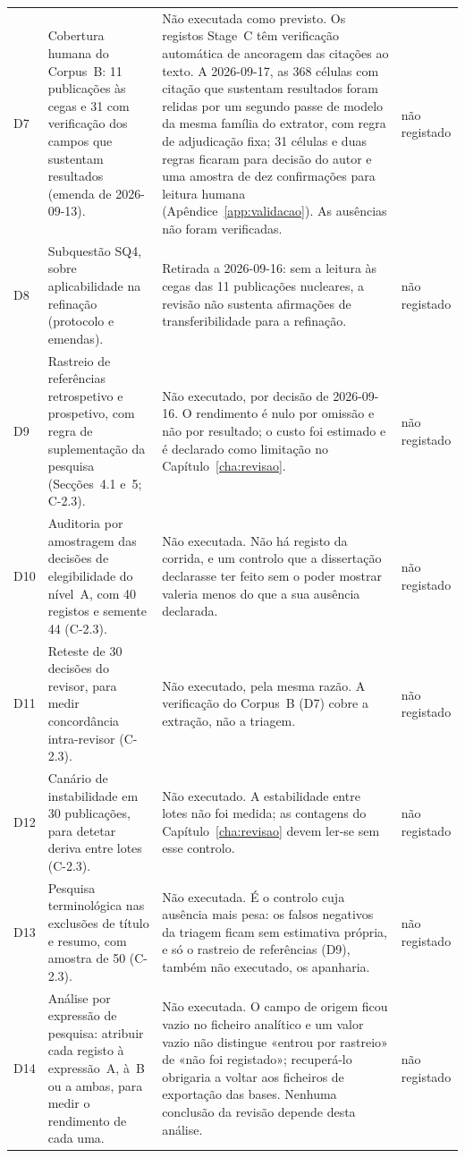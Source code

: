 {\begin{xltabular}{\linewidth}{@{}l>{\raggedright\arraybackslash}X>{\raggedright\arraybackslash}Xl@{}}
D7 & Cobertura humana do Corpus~B: 11 publicações às cegas e 31 com verificação dos campos que sustentam resultados (emenda de 2026-09-13). & Não executada como previsto. Os registos Stage~C têm verificação automática de ancoragem das citações ao texto. A 2026-09-17, as 368 células com citação que sustentam resultados foram relidas por um segundo passe de modelo da mesma família do extrator, com regra de adjudicação fixa; 31 células e duas regras ficaram para decisão do autor e uma amostra de dez confirmações para leitura humana (Apêndice~\ref{app:validacao}). As ausências não foram verificadas. & não registado \\
D8 & Subquestão SQ4, sobre aplicabilidade na refinação (protocolo e emendas). & Retirada a 2026-09-16: sem a leitura às cegas das 11 publicações nucleares, a revisão não sustenta afirmações de transferibilidade para a refinação. & não registado \\
D9 & Rastreio de referências retrospetivo e prospetivo, com regra de suplementação da pesquisa (Secções~4.1 e~5; C-2.3). & Não executado, por decisão de 2026-09-16. O rendimento é nulo por omissão e não por resultado; o custo foi estimado e é declarado como limitação no Capítulo~\ref{cha:revisao}. & não registado \\
D10 & Auditoria por amostragem das decisões de elegibilidade do nível~A, com 40 registos e semente 44 (C-2.3). & Não executada. Não há registo da corrida, e um controlo que a dissertação declarasse ter feito sem o poder mostrar valeria menos do que a sua ausência declarada. & não registado \\
D11 & Reteste de 30 decisões do revisor, para medir concordância intra-revisor (C-2.3). & Não executado, pela mesma razão. A verificação do Corpus~B (D7) cobre a extração, não a triagem. & não registado \\
D12 & Canário de instabilidade em 30 publicações, para detetar deriva entre lotes (C-2.3). & Não executado. A estabilidade entre lotes não foi medida; as contagens do Capítulo~\ref{cha:revisao} devem ler-se sem esse controlo. & não registado \\
D13 & Pesquisa terminológica nas exclusões de título e resumo, com amostra de 50 (C-2.3). & Não executada. É o controlo cuja ausência mais pesa: os falsos negativos da triagem ficam sem estimativa própria, e só o rastreio de referências (D9), também não executado, os apanharia. & não registado \\
D14 & Análise por expressão de pesquisa: atribuir cada registo à expressão~A, à~B ou a ambas, para medir o rendimento de cada uma. & Não executada. O campo de origem ficou vazio no ficheiro analítico e um valor vazio não distingue «entrou por rastreio» de «não foi registado»; recuperá-lo obrigaria a voltar aos ficheiros de exportação das bases. Nenhuma conclusão da revisão depende desta análise. & não registado \\

\end{xltabular}}

